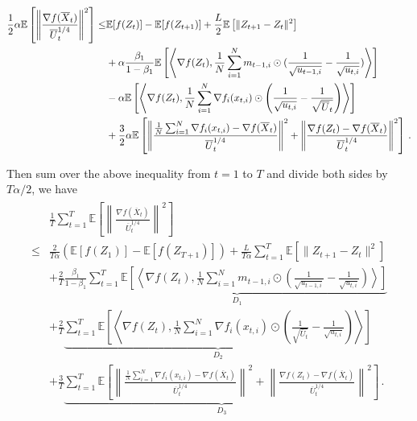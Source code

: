 \documentclass[11pt]{article}
\begin{document}
\begin{align}
\begin{split}\notag
\frac{1}{2} \alpha \mathbb E \left [\left\|\frac{\nabla f( \overline X_{t})}{\overline U_{t}^{1/4}}\right\|^2  \right]
\leq & \mathbb E  [f( Z_{t})]  -  \mathbb E [f( Z_{t+1})] + \frac{L}{2} \mathbb E\left[\| Z_{t+1}-  Z_{t}\|^2 \right] \nonumber  \\
&+ \alpha \frac{\beta_1}{1-\beta_1}  \mathbb E \left [\left \langle \nabla f( Z_{t}) , \frac{1}{N} \sum_{i=1}^N m_{t-1	,i} \odot (\frac{1}{\sqrt{u_{t-1,i}}} - \frac{1}{\sqrt{u_{t,i}}}) \right \rangle \right] \nonumber \\
& - \alpha \mathbb E \left [ \left \langle \nabla f( Z_{t}), \frac{1}{N} \sum_{i=1}^N \nabla f_i( x_{t,i})\odot \left(\frac{1}{\sqrt{u_{t,i}}} - \frac{1}{\sqrt{\overline U_{t}}}  \right)  \right \rangle \right] \nonumber \\
& + \frac{3}{2} \alpha \mathbb E \left [ \left\|  \frac{ \frac{1}{N}\sum_{i=1}^N \nabla f_i( x_{t,i}) -  \nabla f( \overline X_{t})}{\overline U_{t}^{1/4}}  \right\|^2 + \left\|\frac{\nabla f( Z_{t}) -\nabla f( \overline X_{t})}{\overline U_{t}^{1/4}}\right\|^2 \right] \, .
\end{split}
\end{align}



Then sum over the above inequality from $t= 1$ to $T$ and divide both sides by $T\alpha/2$, we have
\begin{align}\label{eq: exp_telescope}
\begin{split}
& \frac{1}{T}\sum_{t=1}^T  \mathbb E \left [\left\|\frac{\nabla f( \overline X_{t})}{\overline U_{t}^{1/4}}\right\|^2  \right]\\
\leq & \frac{2}{T\alpha} ( \mathbb E  [f( Z_{1})]  -  \mathbb E [f( Z_{T+1})]) + \frac{L}{T\alpha} \sum_{t=1}^T\mathbb E\left[\| Z_{t+1}-  Z_{t}\|^2 \right]   \\
&+ \frac{2}{T}\frac{\beta_1}{1-\beta_1} \underbrace{\sum_{t=1}^T   \mathbb E \left [\left \langle \nabla f( Z_{t}) , \frac{1}{N} \sum_{i=1}^N m_{t-1	,i} \odot (\frac{1}{\sqrt{u_{t-1,i}}} - \frac{1}{\sqrt{u_{t,i}}}) \right \rangle \right]}_{D_1}  \\
& + \frac{2}{T} \underbrace{\sum_{t=1}^T \mathbb E \left [ \left \langle \nabla f( Z_{t}), \frac{1}{N} \sum_{i=1}^N \nabla f_i( x_{t,i})\odot \left( \frac{1}{\sqrt{\overline U_{t}}} -\frac{1}{\sqrt{u_{t,i}}}  \right)  \right \rangle \right] }_{D_2} \\
& + \frac{3}{T} \underbrace{\sum_{t=1}^T \mathbb E \left [ \left\|  \frac{ \frac{1}{N}\sum_{i=1}^N \nabla f_i( x_{t,i}) -  \nabla f( \overline X_{t})}{\overline U_{t}^{1/4}}  \right\|^2 + \left\|\frac{\nabla f( Z_{t}) -\nabla f( \overline X_{t})}{\overline U_{t}^{1/4}}\right\|^2 \right]}_{D_3} \, .
\end{split}
\end{align}
\end{document}
